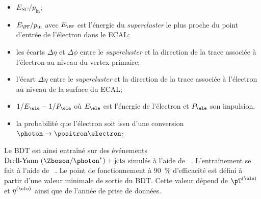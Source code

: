 \begin{itemize}
\item $E_{SC}/p_\text{in}$;
\item $E_{\PF}/p_\text{in}$ avec $E_{\PF}$ est l'énergie du \emph{supercluster} le plus proche du point d'entrée de l'électron dans le ECAL;
\item les écarts $\Delta\eta$ et $\Delta\phi$ entre le \emph{supercluster} et la direction de la trace associée à l'électron au niveau du vertex primaire;
\item l'écart $\Delta\eta$ entre le \emph{supercluster} et la direction de la trace associée à l'électron au niveau de la surface du ECAL;
\item $1/E_{\ele}-1/P_{\ele}$ où $E_{\ele}$ est l'énergie de l'électron et $P_{\ele}$ son impulsion.

\item la probabilité que l'électron soit issu d'une conversion $\photon\to\positron\electron$;
\end{itemize}
\par
Le BDT est ainsi entraîné sur des événements $\text{Drell-Yann ($\Zboson/\photon^*$)} + \text{jets}$ simulés à l'aide de \MADGRAPH~\cite{madgraph5}.
L'entraînement se fait à l'aide de \XGBOOST~\cite{xgboost}.
Le point de fonctionnement à \SI{90}{\%} d'efficacité est défini à partir d'une valeur minimale de sortie du BDT.
Cette valeur dépend de $\pT^{(\ele)}$ et $\eta^{(\ele)}$ ainsi que de l'année de prise de données.

